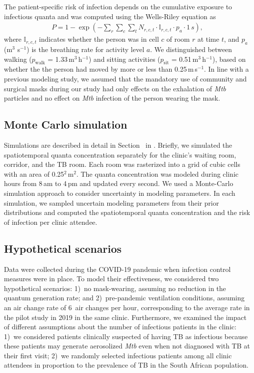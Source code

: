 \documentclass[fleqn,11pt]{wlscirep}
\begin{document}
The patient-specific risk of infection depends on the cumulative exposure to infectious quanta and was computed using the Wells-Riley equation as
\begin{align}
    P = 1-\exp\left(-\sum_r \sum_c \sum_t N_{r,c,t} \cdot \mathbb{I}_{r,c,t} \cdot p_a\cdot1\,s\right),
\end{align}
where $\mathbb{I}_{r,c,t}$ indicates whether the person was in cell $c$ of room $r$ at time $t$, and $p_a$ (m$^3$ s$^{-1}$) is the breathing rate for activity level $a$. We distinguished between walking ($p_\mathrm{walk}$ = 1.33\,m$^3$\,h$^{-1}$) and sitting activities ($p_\mathrm{sit}$ = 0.51\,m$^3$\,h$^{-1}$)\cite{Adams1993}, based on whether the the person had moved by more or less than 0.25\,m\,s$^{-1}$. In line with a previous modeling study\cite{McCreesh2021BMJGlobalHealth}, we assumed that the mandatory use of community and surgical masks during our study had only effects on the exhalation of \emph{Mtb} particles and no effect on \emph{Mtb} infection of the person wearing the mask.

\subsection*{Monte Carlo simulation}

Simulations are described in detail in Section~ in \supp. Briefly, we simulated the spatiotemporal quanta concentration separately for the clinic's waiting room, corridor, and the TB room. Each room was rasterized into a grid of cubic cells with an area of 0.25$^2$\,m$^2$. The quanta concentration was modeled during clinic hours from 8\,am to 4\,pm and updated every second. We used a Monte-Carlo simulation approach to consider uncertainty in modeling parameters. In each simulation, we sampled uncertain modeling parameters from their prior distributions and computed the spatiotemporal quanta concentration and the risk of infection per clinic attendee.

\subsection*{Hypothetical scenarios}

Data were collected during the COVID-19 pandemic when infection control measures were in place. To model their effectiveness, we considered two hypothetical scenarios: 1)~no mask-wearing, \ie assuming no reduction in the quantum generation rate; and 2)~pre-pandemic ventilation conditions, \ie assuming an air change rate of 6~air changes per hour, corresponding to the average rate in the pilot study in 2019 in the same clinic\cite{Zurcher2022JID}. Furthermore, we examined the impact of different assumptions about the number of infectious patients in the clinic: 1)~we considered patients clinically suspected of having TB as infectious because these patients may generate aerosolized \emph{Mtb} even when not diagnosed with TB at their first visit\cite{Patterson2024PNAS}; 2)~we randomly selected infectious patients among all clinic attendees in proportion to the prevalence of TB in the South African population\cite{Moyo2022LancetID}. 
\end{document}
